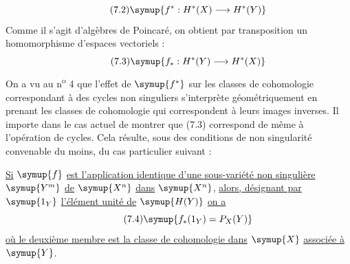 \begin{equation}\tag{7.2}
  \symup{f^{*}:H^{*}(X)\longrightarrow H^{*}(Y)}
\end{equation}
Comme il s'agit d'algèbres de Poincaré, on obtient par transposition un
homomorphisme d'espaces vectoriels :
\begin{equation}\tag{7.3}
  \symup{f_{*}:H^{*}(Y)\longrightarrow H^{*}(X)}
\end{equation}
On a vu au n\textsuperscript{o} 4 que l'effet de $\symup{f^{*}}$ sur les classes de
cohomologie correspondant à des cycles non singuliers s'interprète
géométriquement en prenant les classes de cohomologie qui correspondent à leurs
images inverses. Il importe dans le cas actuel de montrer que (7.3) correspond
de même à l'opération  de cycles. Cela résulte, sous des
conditions de non singularité convenable du moins, du cas particulier suivant :

 \uline{Si} $\symup{f}$ \uline{est l'application identique d'une sous-variété non
singulière} $\symup{Y^{m}}$ \uline{de} $\symup{X^{n}}$ \uline{dans} $\symup{X^{n}}$, \uline{alors, désignant par} $\symup{1_Y}$
\uline{l'élément unité de} $\symup{H(Y)}$ \uline{on a}
\begin{equation}\tag{7.4}
  \symup{f_{*}(1_Y)=P_X(Y)}
\end{equation}
\uline{où le deuxième membre est la classe de cohomologie dans} $\symup{X}$ \uline{associée à} $\symup{Y}$.

